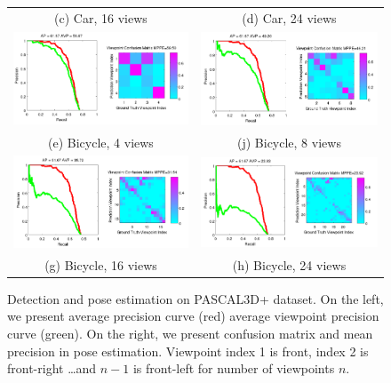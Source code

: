 \documentclass[10pt,twocolumn,letterpaper]{article}
\begin{document}
\begin{figure}[h]
\begin{tabular}{cc}
    (c) Car, 16 views&
    (d) Car, 24 views\\
  \includegraphics[width=0.45\linewidth]{supp/bicycle_cnn4_crop.png}&
  \includegraphics[width=0.45\linewidth]{supp/bicycle_cnn8_crop.png}\\
    (e) Bicycle, 4 views&
    (j) Bicycle, 8 views\\  
  \includegraphics[width=0.45\linewidth]{supp/bicycle_cnn16_crop.png}&
  \includegraphics[width=0.45\linewidth]{supp/bicycle_cnn24_crop.png}\\
    (g) Bicycle, 16 views&
    (h) Bicycle, 24 views\\
  \end{tabular}
  \caption{Detection and pose estimation on PASCAL3D+ dataset. On the left, we
  present average precision curve (red) average viewpoint precision curve
  (green). On the right, we present confusion matrix and mean precision in pose
  estimation. Viewpoint index 1 is front, index 2 is front-right \dots and
  $n-1$ is front-left for number of viewpoints $n$.}
  \label{fig:pascal_ap}
\end{figure}
%
\end{document}
